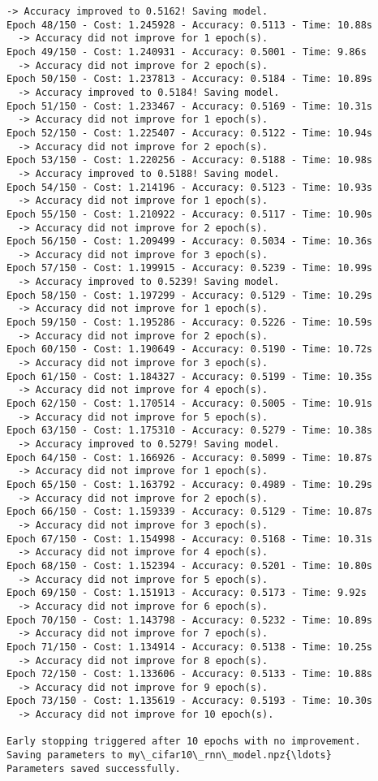 \documentclass[11pt]{article}
\begin{document}
\begin{Verbatim}[commandchars=\\\{\}]
  -> Accuracy improved to 0.5162! Saving model.
Epoch 48/150 - Cost: 1.245928 - Accuracy: 0.5113 - Time: 10.88s
  -> Accuracy did not improve for 1 epoch(s).
Epoch 49/150 - Cost: 1.240931 - Accuracy: 0.5001 - Time: 9.86s
  -> Accuracy did not improve for 2 epoch(s).
Epoch 50/150 - Cost: 1.237813 - Accuracy: 0.5184 - Time: 10.89s
  -> Accuracy improved to 0.5184! Saving model.
Epoch 51/150 - Cost: 1.233467 - Accuracy: 0.5169 - Time: 10.31s
  -> Accuracy did not improve for 1 epoch(s).
Epoch 52/150 - Cost: 1.225407 - Accuracy: 0.5122 - Time: 10.94s
  -> Accuracy did not improve for 2 epoch(s).
Epoch 53/150 - Cost: 1.220256 - Accuracy: 0.5188 - Time: 10.98s
  -> Accuracy improved to 0.5188! Saving model.
Epoch 54/150 - Cost: 1.214196 - Accuracy: 0.5123 - Time: 10.93s
  -> Accuracy did not improve for 1 epoch(s).
Epoch 55/150 - Cost: 1.210922 - Accuracy: 0.5117 - Time: 10.90s
  -> Accuracy did not improve for 2 epoch(s).
Epoch 56/150 - Cost: 1.209499 - Accuracy: 0.5034 - Time: 10.36s
  -> Accuracy did not improve for 3 epoch(s).
Epoch 57/150 - Cost: 1.199915 - Accuracy: 0.5239 - Time: 10.99s
  -> Accuracy improved to 0.5239! Saving model.
Epoch 58/150 - Cost: 1.197299 - Accuracy: 0.5129 - Time: 10.29s
  -> Accuracy did not improve for 1 epoch(s).
Epoch 59/150 - Cost: 1.195286 - Accuracy: 0.5226 - Time: 10.59s
  -> Accuracy did not improve for 2 epoch(s).
Epoch 60/150 - Cost: 1.190649 - Accuracy: 0.5190 - Time: 10.72s
  -> Accuracy did not improve for 3 epoch(s).
Epoch 61/150 - Cost: 1.184327 - Accuracy: 0.5199 - Time: 10.35s
  -> Accuracy did not improve for 4 epoch(s).
Epoch 62/150 - Cost: 1.170514 - Accuracy: 0.5005 - Time: 10.91s
  -> Accuracy did not improve for 5 epoch(s).
Epoch 63/150 - Cost: 1.175310 - Accuracy: 0.5279 - Time: 10.38s
  -> Accuracy improved to 0.5279! Saving model.
Epoch 64/150 - Cost: 1.166926 - Accuracy: 0.5099 - Time: 10.87s
  -> Accuracy did not improve for 1 epoch(s).
Epoch 65/150 - Cost: 1.163792 - Accuracy: 0.4989 - Time: 10.29s
  -> Accuracy did not improve for 2 epoch(s).
Epoch 66/150 - Cost: 1.159339 - Accuracy: 0.5129 - Time: 10.87s
  -> Accuracy did not improve for 3 epoch(s).
Epoch 67/150 - Cost: 1.154998 - Accuracy: 0.5168 - Time: 10.31s
  -> Accuracy did not improve for 4 epoch(s).
Epoch 68/150 - Cost: 1.152394 - Accuracy: 0.5201 - Time: 10.80s
  -> Accuracy did not improve for 5 epoch(s).
Epoch 69/150 - Cost: 1.151913 - Accuracy: 0.5173 - Time: 9.92s
  -> Accuracy did not improve for 6 epoch(s).
Epoch 70/150 - Cost: 1.143798 - Accuracy: 0.5232 - Time: 10.89s
  -> Accuracy did not improve for 7 epoch(s).
Epoch 71/150 - Cost: 1.134914 - Accuracy: 0.5138 - Time: 10.25s
  -> Accuracy did not improve for 8 epoch(s).
Epoch 72/150 - Cost: 1.133606 - Accuracy: 0.5133 - Time: 10.88s
  -> Accuracy did not improve for 9 epoch(s).
Epoch 73/150 - Cost: 1.135619 - Accuracy: 0.5193 - Time: 10.30s
  -> Accuracy did not improve for 10 epoch(s).

Early stopping triggered after 10 epochs with no improvement.
Saving parameters to my\_cifar10\_rnn\_model.npz{\ldots}
Parameters saved successfully.
    \end{Verbatim}
\end{document}
